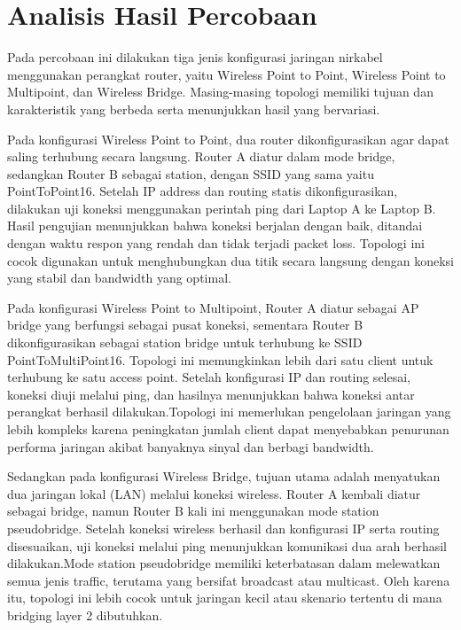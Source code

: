 \section{Analisis Hasil Percobaan}
Pada percobaan ini dilakukan tiga jenis konfigurasi jaringan nirkabel menggunakan perangkat router, 
yaitu Wireless Point to Point, Wireless Point to Multipoint, dan Wireless Bridge. Masing-masing 
topologi memiliki tujuan dan karakteristik yang berbeda serta menunjukkan hasil yang bervariasi.

Pada konfigurasi Wireless Point to Point, dua router dikonfigurasikan agar dapat saling terhubung 
secara langsung. Router A diatur dalam mode bridge, sedangkan Router B sebagai station, dengan SSID 
yang sama yaitu PointToPoint16. Setelah IP address dan routing statis dikonfigurasikan, dilakukan 
uji koneksi menggunakan perintah ping dari Laptop A ke Laptop B. Hasil pengujian menunjukkan bahwa 
koneksi berjalan dengan baik, ditandai dengan waktu respon yang rendah dan tidak terjadi packet loss. 
Topologi ini cocok digunakan untuk menghubungkan dua titik secara langsung dengan koneksi yang stabil 
dan bandwidth yang optimal.

Pada konfigurasi Wireless Point to Multipoint, Router A diatur sebagai AP bridge yang berfungsi 
sebagai pusat koneksi, sementara Router B dikonfigurasikan sebagai station bridge untuk terhubung ke 
SSID PointToMultiPoint16. Topologi ini memungkinkan lebih dari satu client untuk terhubung ke satu 
access point. Setelah konfigurasi IP dan routing selesai, koneksi diuji melalui ping, dan hasilnya 
menunjukkan bahwa koneksi antar perangkat berhasil dilakukan.Topologi ini memerlukan 
pengelolaan jaringan yang lebih kompleks karena peningkatan jumlah client dapat menyebabkan penurunan 
performa jaringan akibat banyaknya sinyal dan berbagi bandwidth.

Sedangkan pada konfigurasi Wireless Bridge, tujuan utama adalah menyatukan dua jaringan lokal (LAN) 
melalui koneksi wireless. Router A kembali diatur sebagai bridge, namun Router B kali ini menggunakan 
mode station pseudobridge. Setelah koneksi wireless berhasil dan konfigurasi IP serta routing 
disesuaikan, uji koneksi melalui ping menunjukkan komunikasi dua arah berhasil dilakukan.Mode 
station pseudobridge memiliki keterbatasan dalam melewatkan semua jenis traffic, terutama yang 
bersifat broadcast atau multicast. Oleh karena itu, topologi ini lebih cocok untuk jaringan kecil 
atau skenario tertentu di mana bridging layer 2 dibutuhkan.



